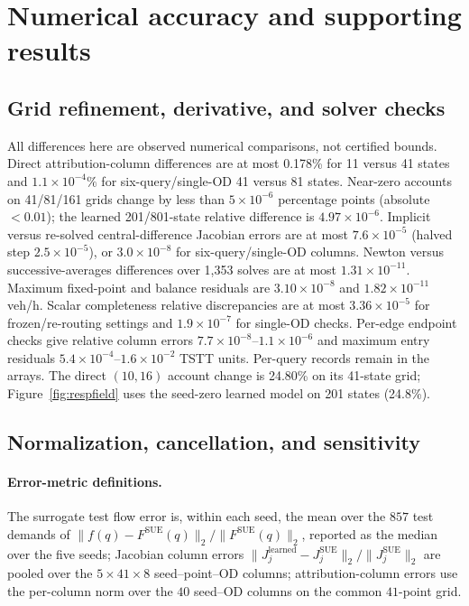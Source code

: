 \section{Numerical accuracy and supporting results}\label{supp:numdetail}\label{supp:transrecords}
\subsection{Grid refinement, derivative, and solver checks}\label{supp:accuracy}
All differences here are observed numerical comparisons, not certified
bounds. Direct attribution-column differences are at most 0.178\% for
11 versus 41 states and $1.1\times10^{-4}\%$ for six-query/single-OD
41 versus 81 states. Near-zero accounts on 41/81/161 grids change by
less than $5\times10^{-6}$ percentage points (absolute $<0.01$); the
learned 201/801-state relative difference is $4.97\times10^{-6}$.
Implicit versus re-solved central-difference Jacobian errors are at most
$7.6\times10^{-5}$ (halved step $2.5\times10^{-5}$), or
$3.0\times10^{-8}$ for six-query/single-OD columns. Newton versus
successive-averages differences over 1,353 solves are at most
$1.31\times10^{-11}$. Maximum fixed-point and balance residuals are
$3.10\times10^{-8}$ and $1.82\times10^{-11}$ veh/h. Scalar completeness
relative discrepancies are at most $3.36\times10^{-5}$ for
frozen/re-routing settings and $1.9\times10^{-7}$ for single-OD checks.
Per-edge endpoint checks give relative column errors
$7.7\times10^{-8}$--$1.1\times10^{-6}$ and maximum entry residuals
$5.4\times10^{-4}$--$1.6\times10^{-2}$ TSTT units. Per-query records
remain in the arrays. The direct $(10,16)$ account change is 24.80\%
on its 41-state grid; Figure~\ref{fig:respfield} uses the seed-zero
learned model on 201 states (24.8\%).

\subsection{Normalization, cancellation, and sensitivity}\label{supp:additional}
\paragraph{Error-metric definitions.}
The surrogate test flow error is, within each seed, the mean over the
$857$ test demands of
$\|f(q)-F^{\mathrm{SUE}}(q)\|_2/\|F^{\mathrm{SUE}}(q)\|_2$, reported
as the median over the five seeds; Jacobian column errors
$\|J_j^{\mathrm{learned}}-J_j^{\mathrm{SUE}}\|_2/\|J_j^{\mathrm{SUE}}\|_2$
are pooled over the $5\times41\times8$ seed--point--OD columns;
attribution-column errors use the per-column norm over the $40$
seed--OD columns on the common $41$-point grid.

